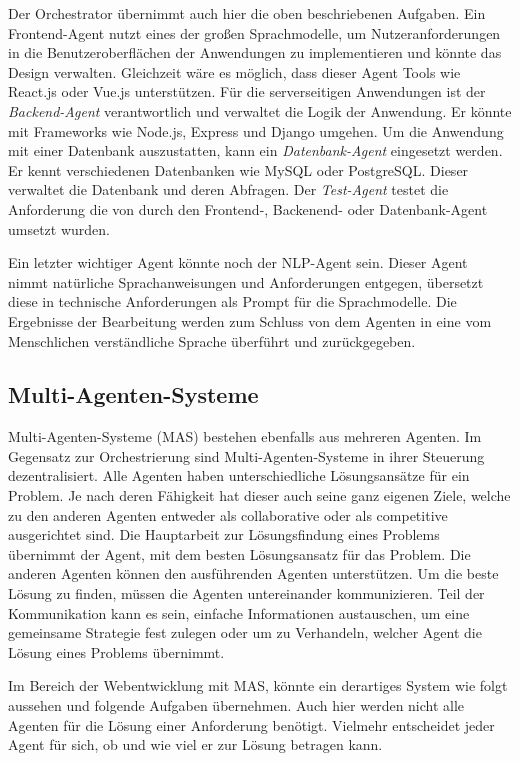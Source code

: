 Der Orchestrator übernimmt auch hier die oben beschriebenen Aufgaben. Ein Frontend-Agent nutzt eines der großen Sprachmodelle, um Nutzeranforderungen in die Benutzeroberflächen der Anwendungen zu implementieren und könnte das Design verwalten. Gleichzeit wäre es möglich, dass dieser Agent Tools wie React.js oder Vue.js unterstützen. Für die serverseitigen Anwendungen ist der \textit{Backend-Agent} verantwortlich und verwaltet die Logik der Anwendung. Er könnte mit Frameworks wie Node.js, Express und Django umgehen. Um die Anwendung mit einer Datenbank auszustatten, kann ein \textit{Datenbank-Agent} eingesetzt werden. Er kennt verschiedenen Datenbanken wie MySQL oder PostgreSQL. Dieser verwaltet die Datenbank und deren Abfragen. Der \textit{Test-Agent} testet die Anforderung die von durch den Frontend-, Backenend- oder Datenbank-Agent umsetzt wurden.\vspace{0.2cm}

Ein letzter wichtiger Agent könnte noch der NLP-Agent sein. Dieser Agent nimmt natürliche Sprachanweisungen und Anforderungen entgegen, übersetzt diese in technische Anforderungen als Prompt für die Sprachmodelle. Die Ergebnisse der Bearbeitung werden zum Schluss von dem Agenten in eine vom Menschlichen verständliche Sprache überführt und zurückgegeben.

\subsection{Multi-Agenten-Systeme}
Multi-Agenten-Systeme (\acrshort{MAS}) bestehen ebenfalls aus mehreren Agenten. Im Gegensatz zur Orchestrierung sind Multi-Agenten-Systeme in ihrer Steuerung dezentralisiert. Alle Agenten haben unterschiedliche Lösungsansätze für ein Problem. Je nach deren Fähigkeit hat dieser auch seine ganz eigenen Ziele, welche zu den anderen Agenten entweder als \gls{collaborative} oder als \gls{competitive} ausgerichtet sind. Die Hauptarbeit zur Lösungsfindung eines Problems übernimmt der Agent, mit dem besten Lösungsansatz für das Problem. Die anderen Agenten können den ausführenden Agenten unterstützen. Um die beste Lösung zu finden, müssen die Agenten untereinander kommunizieren.  Teil der Kommunikation kann es sein, einfache Informationen austauschen, um eine gemeinsame Strategie fest zulegen oder um zu Verhandeln, welcher Agent die Lösung eines Problems übernimmt.\vspace{0.2cm}

Im Bereich der Webentwicklung mit MAS, könnte ein derartiges System wie folgt aussehen und folgende Aufgaben übernehmen. Auch hier werden nicht alle Agenten für die Lösung einer Anforderung benötigt. Vielmehr entscheidet jeder Agent für sich, ob und wie viel er zur Lösung betragen kann.

